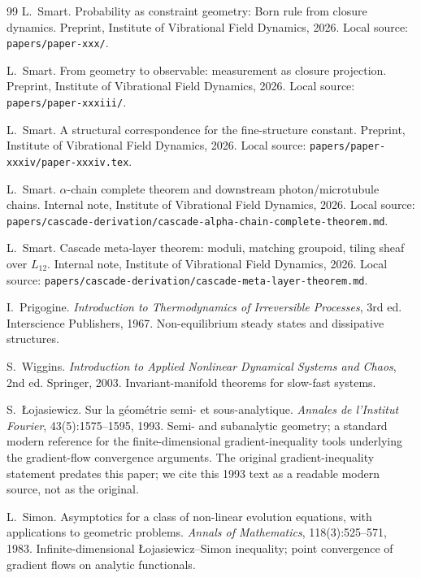 \documentclass[11pt]{article}
\theoremstyle{definition}
\begin{document}
\begin{thebibliography}{99}
L.~Smart.
\newblock Probability as constraint geometry: Born rule from closure dynamics.
\newblock Preprint, Institute of Vibrational Field Dynamics, 2026.
\newblock Local source: \texttt{papers/paper-xxx/}.

L.~Smart.
\newblock From geometry to observable: measurement as closure projection.
\newblock Preprint, Institute of Vibrational Field Dynamics, 2026.
\newblock Local source: \texttt{papers/paper-xxxiii/}.

L.~Smart.
\newblock A structural correspondence for the fine-structure constant.
\newblock Preprint, Institute of Vibrational Field Dynamics, 2026.
\newblock Local source: \texttt{papers/paper-xxxiv/paper-xxxiv.tex}.

L.~Smart.
\newblock $\alpha$-chain complete theorem and downstream photon/microtubule chains.
\newblock Internal note, Institute of Vibrational Field Dynamics, 2026.
\newblock Local source: \texttt{papers/cascade-derivation/cascade-alpha-chain-complete-theorem.md}.

L.~Smart.
\newblock Cascade meta-layer theorem: moduli, matching groupoid, tiling sheaf over $L_{12}$.
\newblock Internal note, Institute of Vibrational Field Dynamics, 2026.
\newblock Local source: \texttt{papers/cascade-derivation/cascade-meta-layer-theorem.md}.

I.~Prigogine.
\newblock \emph{Introduction to Thermodynamics of Irreversible Processes}, 3rd ed.
\newblock Interscience Publishers, 1967.
\newblock Non-equilibrium steady states and dissipative structures.

S.~Wiggins.
\newblock \emph{Introduction to Applied Nonlinear Dynamical Systems and Chaos}, 2nd ed.
\newblock Springer, 2003.
\newblock Invariant-manifold theorems for slow-fast systems.

S.~{\L}ojasiewicz.
\newblock Sur la g\'eom\'etrie semi- et sous-analytique.
\newblock \emph{Annales de l'Institut Fourier}, 43(5):1575--1595, 1993.
\newblock Semi- and subanalytic geometry; a standard modern reference for the finite-dimensional gradient-inequality tools underlying the gradient-flow convergence arguments. The original gradient-inequality statement predates this paper; we cite this 1993 text as a readable modern source, not as the original.

L.~Simon.
\newblock Asymptotics for a class of non-linear evolution equations, with applications to geometric problems.
\newblock \emph{Annals of Mathematics}, 118(3):525--571, 1983.
\newblock Infinite-dimensional {\L}ojasiewicz--Simon inequality; point convergence of gradient flows on analytic functionals.


\end{thebibliography}
\end{document}
